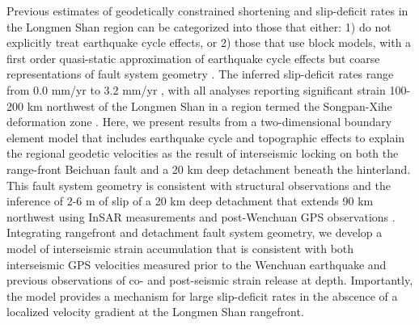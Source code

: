 \documentclass[draft,jgrga]{agutex}
\begin{document}
\begin{article}
Previous estimates of geodetically constrained shortening and slip-deficit rates in the Longmen Shan region can be categorized into those that either: 1) do not explicitly treat earthquake cycle effects, \citep{chen00, shen05, Thatcher2007} or 2) those that use block models, with a first order quasi-static approximation of earthquake cycle effects but coarse representations of fault system geometry \citep{Meade07c, Loveless2011, Burchfiel2008}. The inferred slip-deficit rates range from 0.0 mm/yr \citep{Thatcher2007} to 3.2 mm/yr \citep{Loveless2011}, with all analyses reporting significant strain 100-200 km northwest of the Longmen Shan in a region termed the Songpan-Xihe deformation zone \citep{shen05}. Here, we present results from a two-dimensional boundary element model that includes earthquake cycle and topographic effects to explain the regional geodetic velocities as the result of interseismic locking on both the range-front Beichuan fault and a 20 km deep detachment beneath the hinterland. This fault system geometry is consistent with structural observations \citep{Hubbard2010, Li2010a} and the inference of 2-6 m of slip of a 20 km deep detachment that extends 90 km northwest using InSAR measurements and post-Wenchuan GPS observations \citep{Qi2011, Fielding2013b}. Integrating rangefront and detachment fault system geometry, we develop a model of interseismic strain accumulation that is consistent with both interseismic GPS velocities measured prior to the Wenchuan earthquake and previous observations of co- and post-seismic strain release at depth. Importantly, the model provides a mechanism for large slip-deficit rates in the abscence of a localized velocity gradient at the Longmen Shan rangefront.


\end{article}
\end{document}
